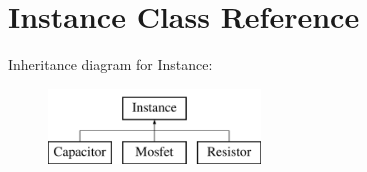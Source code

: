 \hypertarget{class_s_p_i_c_e_1_1_instance}{}\section{Instance Class Reference}
\label{class_s_p_i_c_e_1_1_instance}
Inheritance diagram for Instance\+:\begin{figure}[H]
\begin{center}
\leavevmode
\includegraphics[height=2.000000cm]{class_s_p_i_c_e_1_1_instance}
\end{center}
\end{figure}
